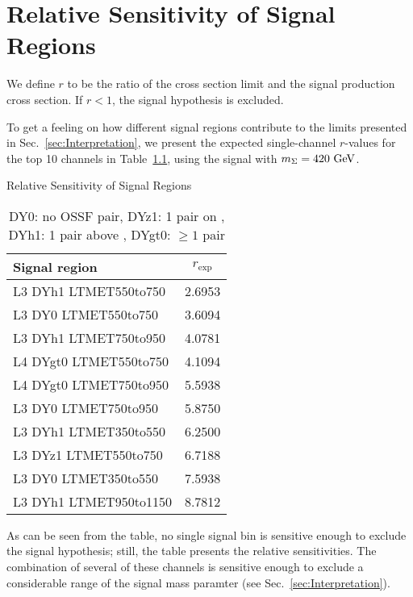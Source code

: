 \chapter{Relative Sensitivity of Signal Regions}
\label{app:RelativeSensitivity}

We define $r$ to be the ratio of the cross section limit and the signal production cross section. If $r < 1$, the signal hypothesis is excluded.

To get a feeling on how different signal regions contribute to the limits presented in Sec.~\ref{sec:Interpretation}, we present the expected single-channel $r$-values for the top 10 channels in Table~\ref{tab:topSensitivity}, using the signal with $m_\Sigma = 420\,\,\text{Ge\hspace{-.08em}V}$.

\begin{table}[h]
\centering
\caption{Relative Sensitivity of Signal Regions} \label{tab:topSensitivity}
\caption*{DY0: no OSSF pair, DYz1: 1 pair on \Z,\\ DYh1: 1 pair above \Z, DYgt0: $\geq 1$ pair}
\begin{tabular}{l c}
\hline\hline
Signal region & $r_\textrm{exp}$\\
\hline
L3 DYh1 LTMET550to750 & 2.6953\\
L3 DY0 LTMET550to750 & 3.6094\\
L3 DYh1 LTMET750to950 & 4.0781\\
L4 DYgt0 LTMET550to750 & 4.1094\\
L4 DYgt0 LTMET750to950 & 5.5938\\
\hline
L3 DY0 LTMET750to950 & 5.8750\\
L3 DYh1 LTMET350to550 & 6.2500\\
L3 DYz1 LTMET550to750 & 6.7188\\
L3 DY0 LTMET350to550 & 7.5938\\
L3 DYh1 LTMET950to1150 & 8.7812\\
\end{tabular}
\end{table}

As can be seen from the table, no single signal bin is sensitive enough to exclude the signal hypothesis; still, the table presents the relative sensitivities. The combination of several of these channels is sensitive enough to exclude a considerable range of the signal mass paramter (see Sec.~\ref{sec:Interpretation}).
